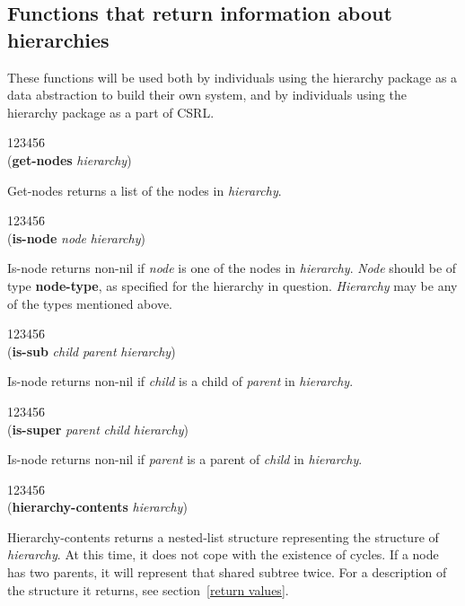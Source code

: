 \subsection{Functions that return information about hierarchies}

These functions will be used both by individuals using the hierarchy
package as a data abstraction to build their own system, and by
individuals using the hierarchy package as a part of CSRL.


\begin{tabbing}
123456\= \kill
\\
({\bf get-nodes} {\it hierarchy\/}) 
\end{tabbing}
Get-nodes returns a list of the nodes in {\it hierarchy\/}.

\begin{tabbing}
123456\= \kill
\\
({\bf is-node} {\it node} {\it hierarchy\/}) 
\end{tabbing}
Is-node returns non-nil if {\it node} is one of the nodes in {\it
hierarchy\/}. {\it Node} should be of type {\bf node-type}, as
specified for the hierarchy in question. {\it Hierarchy} may be any of
the types mentioned above.

\begin{tabbing}
123456\= \kill
\\
({\bf is-sub} {\it child} {\it parent} {\it hierarchy\/}) 
\end{tabbing}
Is-node returns non-nil if {\it child} is a child of {\it parent} in
{\it hierarchy\/}.

\begin{tabbing}
123456\= \kill
\\
({\bf is-super} {\it parent} {\it child} {\it hierarchy\/}) 
\end{tabbing}
Is-node returns non-nil if {\it parent} is a parent of {\it child} in
{\it hierarchy\/}.

\begin{tabbing}
123456\= \kill
\\
({\bf hierarchy-contents} {\it hierarchy\/}) 
\end{tabbing}
Hierarchy-contents returns a nested-list structure representing the
structure of {\it hierarchy\/}. At this time, it does not cope with
the existence of cycles. If a node has two parents, it will represent
that shared subtree twice. For a description of the structure it
returns, see section~\ref{return values}.


